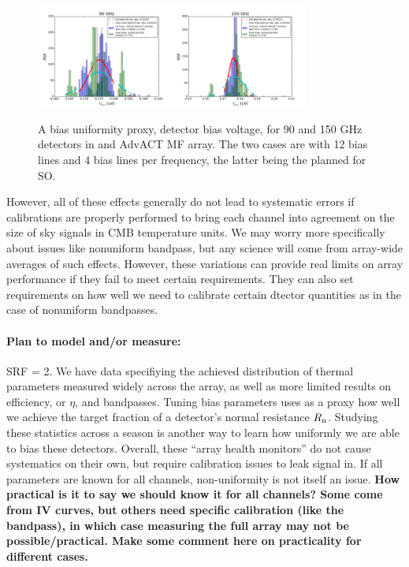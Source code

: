\begin{figure}[h!]
\centering
\includegraphics[width=0.4\textwidth]{figures/bias_volt_90GHz_ACTvsSO.png}\quad\includegraphics[width=0.4\textwidth]{figures/bias_volt_150GHz_ACTvsSO.png}
\caption{A bias uniformity proxy, detector bias voltage, for 90 and 150 GHz detectors in and AdvACT MF array. The two cases are with 12 bias lines and 4 bias lines per frequency, the latter being the planned for SO.}
\label{expect_biasability}
\end{figure}

However, all of these effects generally do not lead to systematic errors if calibrations are properly performed to bring each channel into agreement on the size of sky signals in CMB temperature units. We may worry more specifically about issues like nonuniform bandpass, but any science will come from array-wide averages of such effects. However, these variations can provide real limits on array performance if they fail to meet certain requirements. They can also set requirements on how well we need to calibrate certain dtector quantities as in the case of nonuniform bandpasses.

\paragraph{Plan to model and/or measure:}
SRF = 2. We have data specifiying the achieved distribution of thermal parameters measured widely across the array, as well as more limited results on efficiency, or $\eta$, and bandpasses. Tuning bias parameters uses as a proxy how well we achieve the target fraction of a detector's normal resistance $R_{\mbox{\scriptsize n}}$. Studying these statistics across a season is another way to learn how uniformly we are able to bias these detectors. Overall, these ``array health monitors'' do not cause systematics on their own, but require calibration issues to leak signal in. If all parameters are known for all channels, non-uniformity is not itself an issue. \textbf{How practical is it to say we should know it for all channels? Some come from IV curves, but others need specific calibration (like the bandpass), in which case measuring the full array may not be possible/practical. Make some comment here on practicality for different cases.} 

